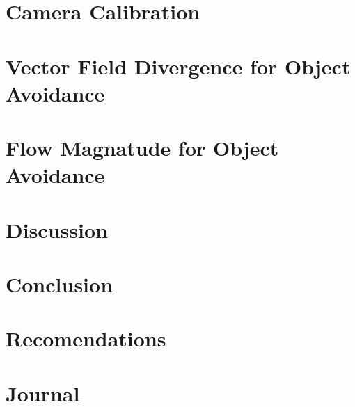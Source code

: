 \documentclass{UoNMCHA}
\numberwithin{equation}{section}
\begin{document}
\section{Camera Calibration}

\newpage
\section{Vector Field Divergence for Object Avoidance}

\newpage
\section{Flow Magnatude for Object Avoidance}

\newpage
\section{Discussion}

\newpage
\section{Conclusion}\label{sec:Conclusion}

\newpage
\section{Recomendations}

\newpage


\appendix
\newpage
\section{Journal}\label{app:Journal}
\end{document}
